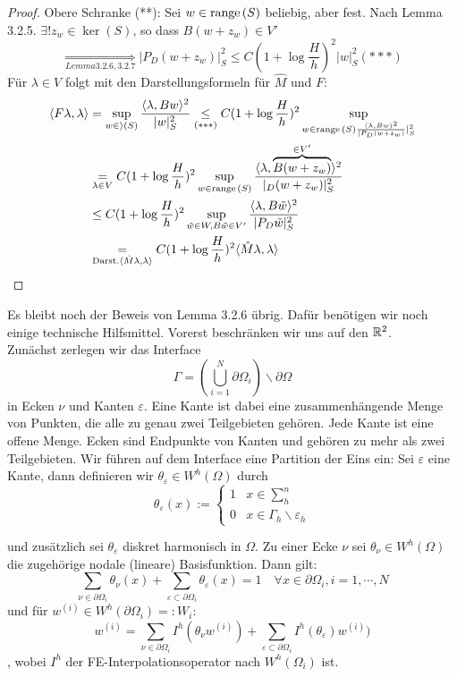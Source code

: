 \begin{proof}
  Obere Schranke (**):
Sei $w\in\textnormal{range}\,(S)$ beliebig, aber fest. Nach Lemma 3.2.5. $\exists! z_w\in\ker(S)$, so dass $B(w+z_w)\in V'$
\[
  \underset{Lemma 3.2.6,3.2.7}{\Longrightarrow} |P_D(w+z_w)|_S^2 \leq C(1+\log \frac{H}{h})^2 |w|_S^2 (***)
\]
Für $\lambda\in V$ folgt mit den Darstellungsformeln für $\hat{M}$ und $F$: 
\begin{align*}
  \langle F\lambda,\lambda\rangle &= \sup_{w\in\rangle(S)}\frac{\langle\lambda,Bw\rangle^2}{|w|_S^2} \underset{(***)}{\leq} C(1+\log \frac{H}{h})^2 \sup_{w\in\textnormal{range}\,(S)\frac{\langle\lambda,Bw\rangle^2}{|P_D(w+z_w)}|_S^2}\\
  &\underset{\lambda\in V}{=} C(1+\log \frac{H}{h})^2 \sup_{w\in\textnormal{range}\,(S)} \frac{\langle\lambda,\overbrace{B(w+z_w)}^{\in V'}\rangle^2}{|_D(w+z_w)|_S^2}\\
  &\leq C(1+\log \frac{H}{h})^2 \sup_{\tilde{w}\in W, B\tilde{w}\in V'} \frac{\langle\lambda,B\tilde{w}\rangle^2}{|P_D\tilde{w}|_S^2}\\
  &\underset{\text{Darst.} \langle\hat{M}\lambda,\lambda\rangle}{=} C(1+\log \frac{H}{h})^2 \langle\hat{M}\lambda,\lambda\rangle
\end{align*}
\end{proof}

Es bleibt noch der Beweis von Lemma 3.2.6 übrig. Dafür benötigen wir noch einige technische Hilfsmittel. Vorerst beschränken wir uns auf den $\mathbb{R}^2$. \\

Zunächst zerlegen wir das Interface 
\[
  \Gamma = \left( \bigcup_{i=1}^N \partial\Omega_i \right) \backslash \partial\Omega
\]
in Ecken $\nu$ und Kanten $\varepsilon$. Eine Kante ist dabei eine zusammenhängende Menge von Punkten, die alle zu genau zwei Teilgebieten gehören. Jede Kante ist eine offene Menge. Ecken sind Endpunkte von Kanten und gehören zu mehr als zwei Teilgebieten. Wir führen auf dem Interface eine Partition der Eins ein: 
Sei $\varepsilon$ eine Kante, dann definieren wir $\theta_{\varepsilon} \in W^h(\Omega)$ durch
\[
  \theta_{\varepsilon}(x):= 
  \begin{cases}
    1 &x\in \sum_h^n\\
    0 &x\in \Gamma_h\backslash\varepsilon_h
  \end{cases}
\]

und zusätzlich sei $\theta_\varepsilon$ diskret harmonisch in $\Omega$. Zu einer Ecke $\nu$ sei $\theta_\nu\in W^h(\Omega)$ die zugehörige nodale (lineare) Basisfunktion. Dann gilt: 
\[
  \sum_{\nu\in\partial\Omega_i} \theta_\nu(x) + \sum_{\varepsilon\subset\partial\Omega_i} \theta_\varepsilon(x) =1 \quad \forall x\in \partial\Omega_i, i=1,\cdots,N
\]
und für $w^{(i)}\in W^h(\partial\Omega_i)=: W_i$:
\[
  w^{(i)}=\sum_{\nu\in\partial\Omega_i} I^h(\theta_\nu w^{(i)})+\sum_{\varepsilon\subset\partial\Omega_i} I^h(\theta_\varepsilon)w^{(i)})
\],
wobei $I^h$ der FE-Interpolationsoperator nach $W^h(\Omega_i)$ ist. 

